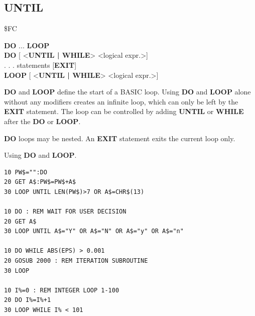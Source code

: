 
\newpage
\subsection{UNTIL}
\begin{description}[leftmargin=2cm,style=nextline]
\item [Token:] \$FC
\item [Format:] {\bf DO} ... {\bf LOOP} \\
                {\bf DO} [ <{\bf UNTIL | WHILE}> <logical expr.>] \\
                . . . statements [{\bf EXIT}] \\
                {\bf LOOP} [ <{\bf UNTIL | WHILE}> <logical expr.>]
\item [Usage:] {\bf DO} and {\bf LOOP} define
                the start of a BASIC loop.
                Using {\bf DO} and {\bf LOOP} alone without any
                modifiers creates an infinite loop, which can only be left
                by the {\bf EXIT} statement. The loop can be
                controlled by adding {\bf UNTIL} or {\bf WHILE}
                after the {\bf DO} or {\bf LOOP}.

\item [Remarks:] {\bf DO} loops may be nested. An {\bf EXIT} statement
               exits the current loop only.
\item [Example:] Using {\bf DO} and {\bf LOOP}.
\begin{tcolorbox}[colback=black,coltext=white]
\verbatimfont{\codefont}
\begin{verbatim}
10 PW$="":DO
20 GET A$:PW$=PW$+A$
30 LOOP UNTIL LEN(PW$)>7 OR A$=CHR$(13)

10 DO : REM WAIT FOR USER DECISION
20 GET A$
30 LOOP UNTIL A$="Y" OR A$="N" OR A$="y" OR A$="n"

10 DO WHILE ABS(EPS) > 0.001
20 GOSUB 2000 : REM ITERATION SUBROUTINE
30 LOOP

10 I%=0 : REM INTEGER LOOP 1-100
20 DO I%=I%+1
30 LOOP WHILE I% < 101
\end{verbatim}
\end{tcolorbox}
\end{description}


\newpage
